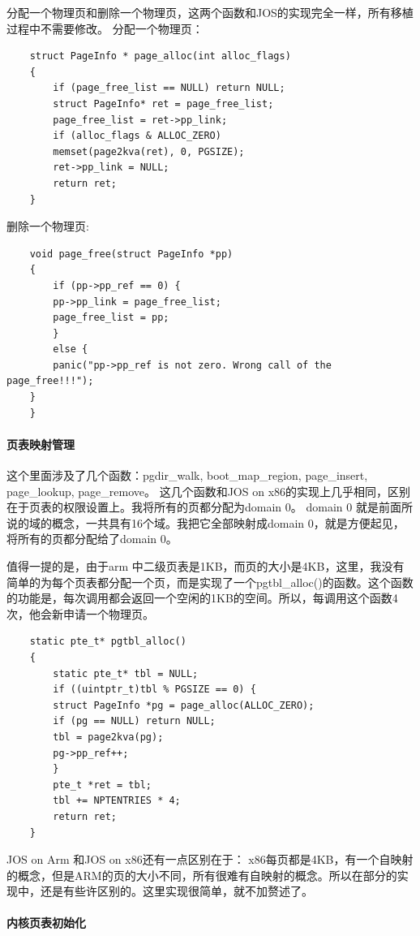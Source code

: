 \documentclass[11pt,a4paper]{article}
\begin{document}
\begin{CJK}{UTF8}{gkai}
	分配一个物理页和删除一个物理页，这两个函数和JOS的实现完全一样，所有移植过程中不需要修改。
	分配一个物理页：
	\begin{lstlisting}
	struct PageInfo * page_alloc(int alloc_flags)
	{
		if (page_free_list == NULL) return NULL;
		struct PageInfo* ret = page_free_list;
		page_free_list = ret->pp_link;
		if (alloc_flags & ALLOC_ZERO) 
		memset(page2kva(ret), 0, PGSIZE);
		ret->pp_link = NULL;
		return ret;
	}
	\end{lstlisting}
	
	
	删除一个物理页:
	\begin{lstlisting}
	void page_free(struct PageInfo *pp)
	{
		if (pp->pp_ref == 0) {
		pp->pp_link = page_free_list;
		page_free_list = pp;
		}
		else {
		panic("pp->pp_ref is not zero. Wrong call of the page_free!!!");
	}
	}
	\end{lstlisting}	
	\paragraph{页表映射管理}
	这个里面涉及了几个函数：pgdir\_walk, boot\_map\_region, page\_insert, page\_lookup, page\_remove。
	这几个函数和JOS on x86的实现上几乎相同，区别在于页表的权限设置上。我将所有的页都分配为domain  0。
	domain 0 就是前面所说的域的概念，一共具有16个域。我把它全部映射成domain 0，就是方便起见，将所有的页都分配给了domain 0。
	
	值得一提的是，由于arm 中二级页表是1KB，而页的大小是4KB，这里，我没有简单的为每个页表都分配一个页，而是实现了一个pgtbl\_alloc()的函数。这个函数的功能是，每次调用都会返回一个空闲的1KB的空间。所以，每调用这个函数4次，他会新申请一个物理页。
	
	
	\begin{lstlisting}
	static pte_t* pgtbl_alloc()
	{
		static pte_t* tbl = NULL;
		if ((uintptr_t)tbl % PGSIZE == 0) {
		struct PageInfo *pg = page_alloc(ALLOC_ZERO);
		if (pg == NULL) return NULL;
		tbl = page2kva(pg);
		pg->pp_ref++;
		}
		pte_t *ret = tbl;
		tbl += NPTENTRIES * 4;
		return ret;
	}
	\end{lstlisting}
	
	JOS on Arm 和JOS on x86还有一点区别在于： x86每页都是4KB，有一个自映射的概念，但是ARM的页的大小不同，所有很难有自映射的概念。所以在部分的实现中，还是有些许区别的。这里实现很简单，就不加赘述了。
	
	\paragraph{内核页表初始化}
	

\end{CJK}
\end{document}
